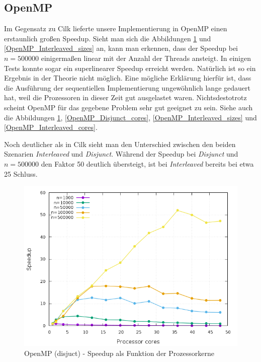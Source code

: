 \subsection{OpenMP}
Im Gegensatz zu Cilk lieferte unsere Implementierung in OpenMP einen erstaunlich großen Speedup.
Sieht man sich die Abbildungen \ref{OpenMP_Disjunct_sizes} und \ref{OpenMP_Interleaved_sizes} an, kann man erkennen, dass der Speedup bei $n = 500000$ einigermaßen linear mit der Anzahl der Threads ansteigt.
In einigen Tests konnte sogar ein superlinearer Speedup erreicht werden.
Natürlich ist so ein Ergebnis in der Theorie nicht möglich.
Eine mögliche Erklärung hierfür ist, dass die Ausführung der sequentiellen Implementierung ungewöhnlich lange gedauert hat, weil die Prozessoren in dieser Zeit gut ausgelastet waren.
Nichtsdestotrotz scheint OpenMP für das gegebene Problem sehr gut geeignet zu sein.
Siehe auch die Abbildungen \ref{OpenMP_Disjunct_sizes}, \ref{OpenMP_Disjunct_cores}, \ref{OpenMP_Interleaved_sizes} und \ref{OpenMP_Interleaved_cores}.

Noch deutlicher als in Cilk sieht man den Unterschied zwischen den beiden Szenarien \emph{Interleaved} und \emph{Disjunct}.
Während der Speedup bei \emph{Disjunct} und $n = 500000$ den Faktor 50 deutlich übersteigt, ist bei \emph{Interleaved} bereits bei etwa 25 Schluss.


\begin{figure}[p]
	\centering
	\includegraphics[width=404pt]{resources/plots/OpenMP_Disjunct_sizes.png}
	\caption{OpenMP (disjuct) - Speedup als Funktion der Prozessorkerne}
	\label{OpenMP_Disjunct_sizes}
\end{figure}

